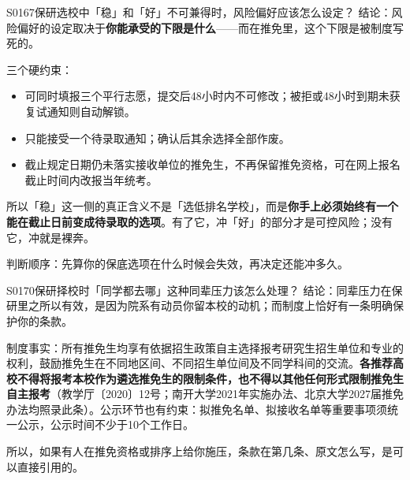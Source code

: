 \begin{qa}{S0167}{保研选校中「稳」和「好」不可兼得时，风险偏好应该怎么设定？}
结论：风险偏好的设定取决于\textbf{你能承受的下限是什么}——而在推免里，这个下限是被制度写死的。

三个硬约束：
\begin{itemize}
  \item 可同时填报三个平行志愿，提交后48小时内不可修改；被拒或48小时到期未获复试通知则自动解锁。
  \item 只能接受一个待录取通知；确认后其余选择全部作废。
  \item 截止规定日期仍未落实接收单位的推免生，不再保留推免资格，可在网上报名截止时间内改报当年统考。
\end{itemize}

所以「稳」这一侧的真正含义不是「选低排名学校」，而是\textbf{你手上必须始终有一个能在截止日前变成待录取的选项}。有了它，冲「好」的部分才是可控风险；没有它，冲就是裸奔。

判断顺序：先算你的保底选项在什么时候会失效，再决定还能冲多久。
\end{qa}

\begin{qa}{S0170}{保研择校时「同学都去哪」这种同辈压力该怎么处理？}
结论：同辈压力在保研里之所以有效，是因为院系有动员你留本校的动机；而制度上恰好有一条明确保护你的条款。

制度事实：所有推免生均享有依据招生政策自主选择报考研究生招生单位和专业的权利，鼓励推免生在不同地区间、不同招生单位间及不同学科间的交流。\textbf{各推荐高校不得将报考本校作为遴选推免生的限制条件，也不得以其他任何形式限制推免生自主报考}（教学厅〔2020〕12号；南开大学2021年实施办法、北京大学2027届推免办法均照录此条）。公示环节也有约束：拟推免名单、拟接收名单等重要事项须统一公示，公示时间不少于10个工作日。

所以，如果有人在推免资格或排序上给你施压，条款在第几条、原文怎么写，是可以直接引用的。
\end{qa}

